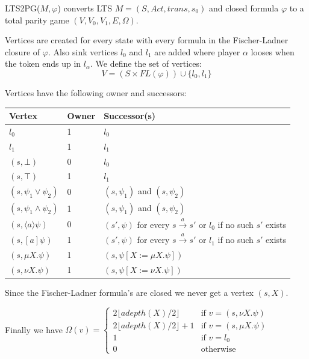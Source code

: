 \begin{definition}
	\label{def_LTS2PG}
	LTS2PG($M, \varphi$) converts LTS $M = (S, Act, trans, s_0)$ and closed formula $\varphi$ to a total parity game $(V, V_0, V_1, E, \Omega)$.
	
	Vertices are created for every state with every formula in the Fischer-Ladner closure of $\varphi$. Also sink vertices $l_0$ and $l_1$ are added where player $\alpha$ looses when the token ends up in $l_\alpha$. We define the set of vertices:
	\[ V = (S \times \textit{FL}(\varphi)) \cup \{l_0,l_1\} \]
	
	Vertices have the following owner and successors:\\
	\begin{center}
		\begin{tabular}{l|l|l}
			Vertex & Owner & Successor(s) \\\hline
			$l_0$ & 1 & $l_0$\\
			$l_1$ & 1 & $l_1$\\
			$(s,\bot)$ & 0     & $l_0$         \\
			$(s,\top)$ & 1     & $l_1$         \\
			$(s,\psi_1 \vee \psi_2)$ & 0       & $(s,\psi_1)$ and $(s,\psi_2)$ \\
			$(s,\psi_1 \wedge \psi_2)$ & 1       & $(s,\psi_1)$ and $(s,\psi_2)$ \\
			$(s, \langle a \rangle \psi)$ & 0 & $(s',\psi)$ for every $s \xrightarrow{ a} s'$ or $l_0$ if no such $s'$ exists \\
			$(s, [ a ] \psi)$ & 1 & $(s',\psi)$ for every $s \xrightarrow{ a} s'$ or $l_1$ if no such $s'$ exists \\
			$(s, \mu X. \psi)$ & 1 & $(s, \psi[X:= \mu X. \psi])$ \\
			$(s, \nu X. \psi)$ & 1 & $(s, \psi[X:= \nu X. \psi])$ 
		\end{tabular}
	\end{center}

	Since the Fischer-Ladner formula's are closed we never get a vertex $(s,X)$.
	
	Finally we have $\Omega(v) = \begin{cases}
	2 \lfloor adepth(X) / 2 \rfloor & \text{if } v = (s,\nu X. \psi)\\
	2 \lfloor adepth(X) / 2 \rfloor + 1 & \text{if } v = (s,\mu X. \psi)\\
	1 & \text{if } v = l_0\\
	0 & \text{otherwise}
	\end{cases}$
\end{definition}
